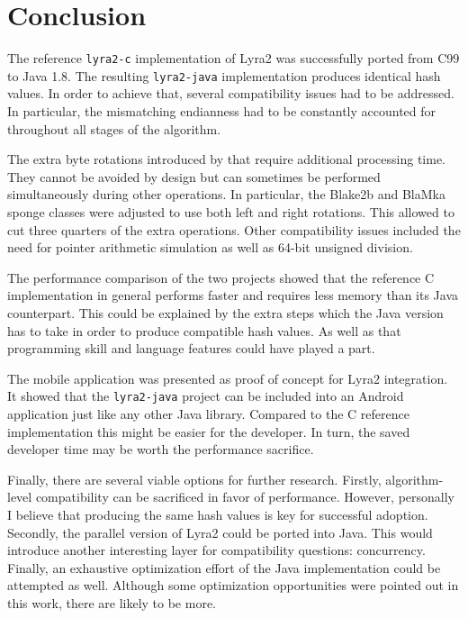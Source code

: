 \chapter{Conclusion}
\label{sec:conclusion}

The reference \texttt{lyra2-c} implementation of Lyra2 was successfully ported from C99 to Java 1.8. The resulting \texttt{lyra2-java} implementation produces identical hash values. In order to achieve that, several compatibility issues had to be addressed. In particular, the mismatching endianness had to be constantly accounted for throughout all stages of the algorithm.

The extra byte rotations introduced by that require additional processing time. They cannot be avoided by design but can sometimes be performed simultaneously during other operations. In particular, the Blake2b and BlaMka sponge classes were adjusted to use both left and right rotations. This allowed to cut three quarters of the extra operations. Other compatibility issues included the need for pointer arithmetic simulation as well as 64-bit unsigned division.

The performance comparison of the two projects showed that the reference C implementation in general performs faster and requires less memory than its Java counterpart. This could be explained by the extra steps which the Java version has to take in order to produce compatible hash values. As well as that programming skill and language features could have played a part.

The mobile application was presented as proof of concept for Lyra2 integration. It showed that the \texttt{lyra2-java} project can be included into an Android application just like any other Java library. Compared to the C reference implementation this might be easier for the developer. In turn, the saved developer time may be worth the performance sacrifice.

Finally, there are several viable options for further research. Firstly, algorithm-level compatibility can be sacrificed in favor of performance. However, personally I believe that producing the same hash values is key for successful adoption. Secondly, the parallel version of Lyra2 could be ported into Java. This would introduce another interesting layer for compatibility questions: concurrency. Finally, an exhaustive optimization effort of the Java implementation could be attempted as well. Although some optimization opportunities were pointed out in this work, there are likely to be more.
